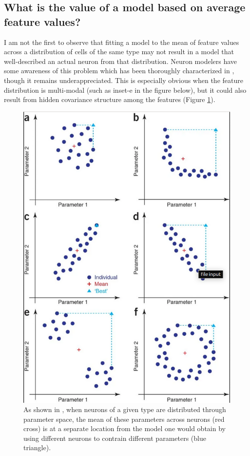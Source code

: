 \subsection{What is the value of a model based on average feature values?}
\label{sec:mean-model}
I am not the first to observe that fitting a model to the mean of feature values across a distribution of cells of the same type may not result in a model that well-described an actual neuron from that distribution.
Neuron modelers have some awareness of this problem which has been thoroughly characterized in \cite{marder2011multiple}, though it remains underappreciated.
This is especially obvious when the feature distribution is multi-modal (such as inset-e in the figure below), but it could also result from hidden covariance structure among the features (Figure \ref{fig:eve_marder}).

\begin{figure}
\begin{center}

\includegraphics[scale=0.65]{figures/eve_marder.png}
\end{center}
\caption[Lessons from Marder]{As shown in \cite{marder2011multiple}, when neurons of a given type are distributed through parameter space, the mean of these parameters across neurons (red cross) is at a separate location from the model one would obtain by using different neurons to contrain different parameters (blue triangle).}
\label{fig:eve_marder}
\end{figure}


